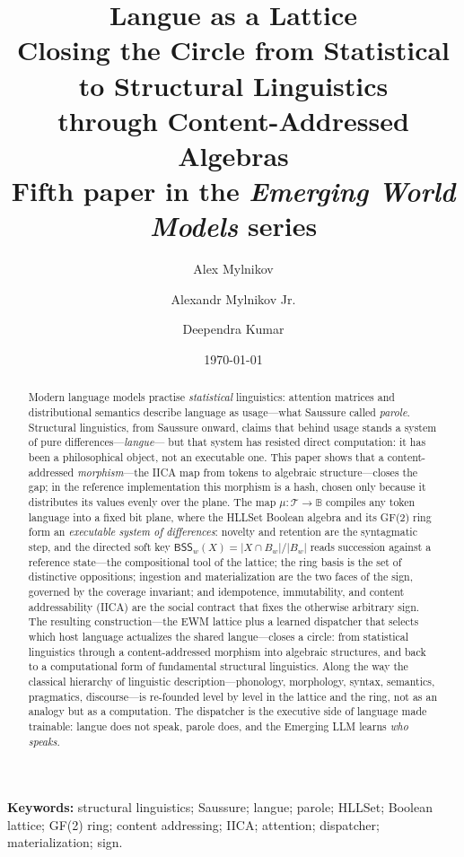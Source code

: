 \documentclass[11pt,a4paper]{article}
\title{\textbf{Langue as a Lattice}\\[4pt]
\large Closing the Circle from Statistical to Structural Linguistics\\
through Content-Addressed Algebras\\[6pt]
\normalsize Fifth paper in the \textit{Emerging World Models} series}
\author{Alex Mylnikov \and Alexandr Mylnikov Jr. \and Deependra Kumar}
\date{\today}
\theoremstyle{remark}
\newcommand{\Plane}{\ensuremath{\mathbb{B}}}            %
\newcommand{\Tok}{\ensuremath{\mathcal{T}}}              %
\newcommand{\BSS}{\ensuremath{\mathsf{BSS}}}             %
\newcommand{\Ing}{\ensuremath{\mu}}                      %
\begin{document}
\maketitle

\begin{abstract}
Modern language models practise \emph{statistical} linguistics: attention
matrices and distributional semantics describe language as usage---what
Saussure called \emph{parole}. Structural linguistics, from Saussure onward,
claims that behind usage stands a system of pure differences---\emph{langue}---
but that system has resisted direct computation: it has been a philosophical
object, not an executable one. This paper shows that a content-addressed
\emph{morphism}---the IICA map from tokens to algebraic structure---closes the
gap; in the reference implementation this morphism is a hash, chosen only
because it distributes its values evenly over the plane. The map
$\Ing : \Tok \to \Plane$ compiles any token language
into a fixed bit plane, where the HLLSet Boolean algebra and its GF(2) ring
form an \emph{executable system of differences}: novelty and retention are the
syntagmatic step, and the directed soft key $\BSS_w(X)=|X\cap B_w|/|B_w|$
reads succession against a reference state---the compositional tool of the
lattice; the ring basis is the set of distinctive oppositions; ingestion and
materialization are the
two faces of the sign, governed by the coverage invariant; and idempotence,
immutability, and content addressability (IICA) are the social contract that
fixes the otherwise arbitrary sign. The resulting construction---the EWM
lattice plus a learned dispatcher that selects which host language actualizes
the shared langue---closes a circle: from statistical linguistics through a
content-addressed morphism into algebraic structures, and back to a
computational form of fundamental structural linguistics. Along the way the
classical hierarchy of linguistic description---phonology, morphology, syntax,
semantics, pragmatics, discourse---is re-founded level by level in the
lattice and the ring, not as an analogy but as a computation. The dispatcher
is the executive side of language made trainable: langue does not speak,
parole does, and the Emerging LLM learns \emph{who speaks}.
\end{abstract}

\noindent\textbf{Keywords:} structural linguistics; Saussure; langue; parole;
HLLSet; Boolean lattice; GF(2) ring; content addressing; IICA; attention;
dispatcher; materialization; sign.
\end{document}
